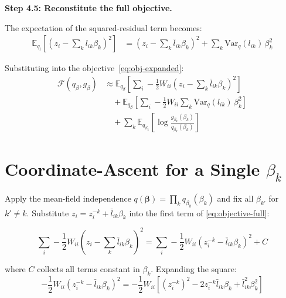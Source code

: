 \documentclass[11pt]{article}
\begin{document}
\begin{derivbox}
\textbf{Step 4.5: Reconstitute the full objective.}

The expectation of the squared-residual term becomes:
\begin{align}
  \mathbb{E}_{q_l}\!\left[\left(z_i - \sum_k l_{ik}\beta_k\right)^{\!2}\right]
  &= \left(z_i - \sum_k \bar{l}_{ik}\beta_k\right)^{\!2}
     + \sum_k \mathrm{Var}_q(l_{ik})\,\beta_k^2
  \label{eq:exp-sq-result}
\end{align}

Substituting into the objective~\eqref{eq:obj-expanded}:
\begin{align}
  \mathcal{F}(q_\beta, g_\beta) &\approx
  \mathbb{E}_{q_\beta}\!\left[\sum_i -\frac{1}{2}W_{ii}\left(z_i - \sum_k \bar{l}_{ik}\beta_k\right)^{\!2}\right]
  \nonumber \\
  &\quad + \mathbb{E}_{q_\beta}\!\left[\sum_i -\frac{1}{2}W_{ii}\sum_k \mathrm{Var}_q(l_{ik})\,\beta_k^2\right]
  \nonumber \\
  &\quad + \sum_k \mathbb{E}_{q_{\beta_k}}\!\left[\log\frac{g_{\beta_k}(\beta_k)}{q_{\beta_k}(\beta_k)}\right]
  \label{eq:objective-full}
\end{align}
\end{derivbox}

\section{Coordinate-Ascent for a Single $\beta_k$}\label{sec:coordinate}

Apply the mean-field independence $q(\bm{\beta}) = \prod_k q_{\beta_k}(\beta_k)$
and fix all $\beta_{k'}$ for $k' \neq k$.  Substitute
$z_i = z_i^{-k} + \bar{l}_{ik}\beta_k$ into the first term of
\eqref{eq:objective-full}:

\begin{equation}
  \sum_i -\frac{1}{2}W_{ii}\left(z_i - \sum_{k} \bar{l}_{ik}\beta_k\right)^{\!2}
  = \sum_i -\frac{1}{2}W_{ii}\left(z_i^{-k} - \bar{l}_{ik}\beta_k\right)^{\!2}
  + C
  \label{eq:ca-step1}
\end{equation}

where $C$ collects all terms constant in $\beta_k$.  Expanding the square:
\begin{equation}
  -\frac{1}{2}W_{ii}\!\left(z_i^{-k} - \bar{l}_{ik}\beta_k\right)^{\!2}
  = -\frac{1}{2}W_{ii}\!\left[\!\left(z_i^{-k}\right)^{\!2}
    - 2z_i^{-k}\bar{l}_{ik}\beta_k + \bar{l}_{ik}^2\beta_k^2\right]
  \label{eq:ca-expand}
\end{equation}
\end{document}
